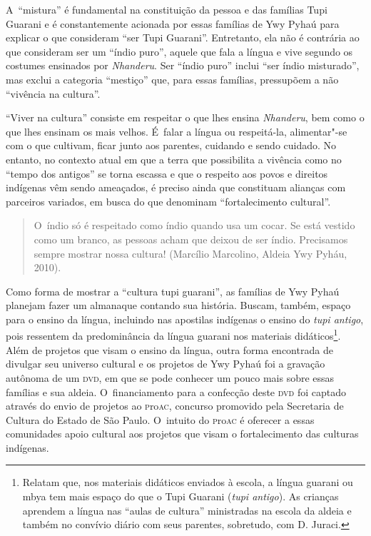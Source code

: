 A~``mistura'' é fundamental na constituição da pessoa e das famílias Tupi
Guarani e é constantemente acionada por essas famílias de Ywy Pyhaú
para explicar o que consideram ``ser Tupi Guarani''. Entretanto, ela não é
contrária ao que consideram ser um ``índio puro'', aquele que fala a língua
e vive segundo os costumes ensinados por \emph{Nhanderu}. Ser ``índio puro''
inclui ``ser índio misturado'', mas exclui a categoria ``mestiço'' que, para
essas famílias, pressupõem a não ``vivência na cultura''.

``Viver na cultura'' consiste em respeitar o que lhes ensina \emph{Nhanderu}, bem
como o que lhes ensinam os mais velhos. É~falar a língua ou
respeitá-la, alimentar"-se com o que cultivam, ficar junto aos parentes,
cuidando e sendo cuidado. No entanto, no contexto atual em que a terra
que possibilita a vivência como no ``tempo dos antigos'' se torna escassa e
que o respeito aos povos e direitos indígenas vêm sendo ameaçados, é
preciso ainda que constituam alianças com parceiros variados, em busca
do que denominam ``fortalecimento cultural''. 

\begin{quote}
\noindent
O~índio só é respeitado como índio quando usa um cocar. Se está vestido
como um branco, as pessoas acham que deixou de ser índio. Precisamos
sempre mostrar nossa cultura! (Marcílio Marcolino, Aldeia Ywy Pyháu,
2010).
\end{quote}

Como forma de mostrar a ``cultura tupi guarani'', as famílias de Ywy Pyhaú
planejam fazer um almanaque contando sua história. Buscam, também,
espaço para o ensino da língua, incluindo nas apostilas indígenas o
ensino do \emph{tupi antigo}, pois ressentem da predominância da língua
guarani nos materiais didáticos\footnote{Relatam que, nos materiais
didáticos enviados à escola, a língua guarani ou mbya tem mais espaço
do que o Tupi Guarani (\emph{tupi antigo}). As crianças aprendem a língua nas
``aulas de cultura'' ministradas na escola da aldeia e também no convívio
diário com seus parentes, sobretudo, com D. Juraci.}. Além de projetos
que visam o ensino da língua, outra forma encontrada de divulgar seu
universo cultural e os projetos de Ywy Pyhaú foi a gravação autônoma de
um \textsc{dvd}, em que se pode conhecer um pouco mais sobre essas famílias e
sua aldeia. O~financiamento para a confecção deste \textsc{dvd} foi captado
através do envio de projetos ao \textsc{p}ro\textsc{ac}, concurso promovido pela
Secretaria de Cultura do Estado de São Paulo. O~intuito do \textsc{p}ro\textsc{ac} é
oferecer a essas comunidades apoio cultural aos projetos que visam o
fortalecimento das culturas indígenas. 

